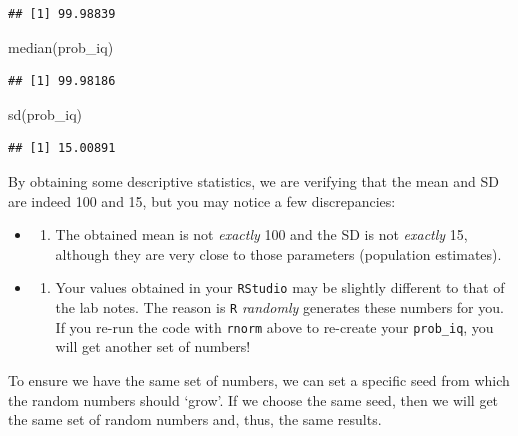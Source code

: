 \documentclass[
]{book}
\newenvironment{Shaded}{\begin{snugshade}}{\end{snugshade}}
\newcommand{\FunctionTok}[1]{\textcolor[rgb]{0.00,0.00,0.00}{#1}}
\newcommand{\NormalTok}[1]{#1}
\providecommand{\tightlist}{%
  \setlength{\itemsep}{0pt}\setlength{\parskip}{0pt}}
\begin{document}
\begin{verbatim}
## [1] 99.98839
\end{verbatim}

\begin{Shaded}
\begin{Highlighting}[]
\FunctionTok{median}\NormalTok{(prob\_iq) }
\end{Highlighting}
\end{Shaded}

\begin{verbatim}
## [1] 99.98186
\end{verbatim}

\begin{Shaded}
\begin{Highlighting}[]
\FunctionTok{sd}\NormalTok{(prob\_iq) }
\end{Highlighting}
\end{Shaded}

\begin{verbatim}
## [1] 15.00891
\end{verbatim}

By obtaining some descriptive statistics, we are verifying that the mean and SD are indeed 100 and 15, but you may notice a few discrepancies:

\begin{itemize}
\item
  \begin{enumerate}
  \def\labelenumi{\arabic{enumi}.}
  \tightlist
  \item
    The obtained mean is not \emph{exactly} 100 and the SD is not \emph{exactly} 15, although they are very close to those parameters (population estimates).
  \end{enumerate}
\item
  \begin{enumerate}
  \def\labelenumi{\arabic{enumi}.}
  \setcounter{enumi}{1}
  \tightlist
  \item
    Your values obtained in your \texttt{RStudio} may be slightly different to that of the lab notes. The reason is \texttt{R} \emph{randomly} generates these numbers for you. If you re-run the code with \texttt{rnorm} above to re-create your \texttt{prob\_iq}, you will get another set of numbers!
  \end{enumerate}
\end{itemize}

To ensure we have the same set of numbers, we can set a specific seed from which the random numbers should `grow'. If we choose the same seed, then we will get the same set of random numbers and, thus, the same results.
\end{document}

